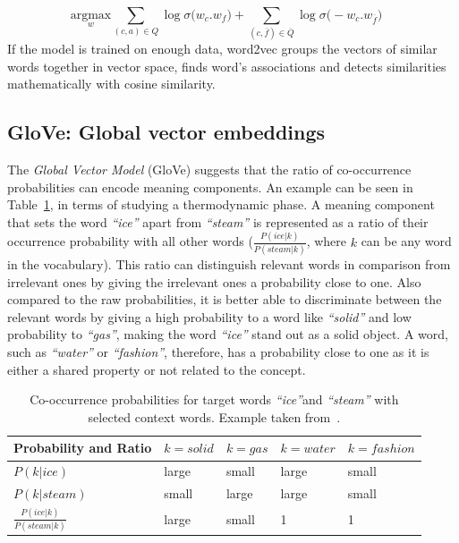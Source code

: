 \begin{equation}
\label{eq:w2v_negative}
\underset { w }{ \mathrm{ argmax } } \sum _{ (c,a)\in Q }^{  }{ \log { \sigma ( } w_{ c }.w_{ f }) } +\sum _{ (c,\overline {f})\in \overline { Q }  }^{  }{ \log { \sigma ( } -w_{ c }.w_{ \overline {f} })\quad  } 
\end{equation}
If the model is trained on enough data, word2vec groups the vectors of similar words together in vector space, finds word’s associations and detects similarities mathematically with cosine similarity. 
\subsection{GloVe: Global vector embeddings}
\label{subsec:GloVe}
The \emph{Global Vector Model} (GloVe) suggests that the ratio of co-occurrence probabilities can encode meaning components. An example can be seen in Table~\ref{table:tab_1}, in terms of studying a thermodynamic phase. A meaning component that sets the word \emph{``ice''} apart from \emph{``steam''} is represented as a ratio of their occurrence probability with all other words \big($\frac { P(ice|k) }{ P(steam|k) } $, where $k$ can be any word in the vocabulary\big). This ratio can distinguish relevant words in comparison from irrelevant ones by giving the irrelevant ones a probability close to one. Also compared to the raw probabilities, it is better able to discriminate between the relevant words by giving a high probability to a word like \emph{``solid''} and low probability to \emph{``gas''}, making the word \emph{``ice''} stand out as a solid object. A word, such as \emph{``water''} or \emph{``fashion''}, therefore, has a probability close to one as it is either a shared property or not related to the concept.\\
\begin{table}[]
\centering

\begin{tabular}{@{}l|l|l|l|l@{}}
\toprule
Probability and Ratio &  $k=solid$& $k=gas$ & $k=water$ &$k= fashion$  \\ \midrule $P(k|ice)$& {\color[HTML]{CB0000}large} &  {\color[HTML]{329A9D}small} & {\color[HTML]{CB0000}large} & {\color[HTML]{329A9D}small} \\\midrule
  $P(k|steam)$&{\color[HTML]{329A9D}small}  & {\color[HTML]{CB0000}large} &  {\color[HTML]{CB0000}large}&{\color[HTML]{329A9D}small}  \\\midrule
 $\frac { P(ice|k) }{ P(steam|k) } $& {\color[HTML]{CB0000}large} &  {\color[HTML]{329A9D}small}&  1 &    1  \\\midrule
\end{tabular}%
\caption{Co-occurrence probabilities for target words \emph{``ice''}and \emph{``steam''} with selected context words. Example taken from~.}
\label{table:tab_1}
\end{table}
